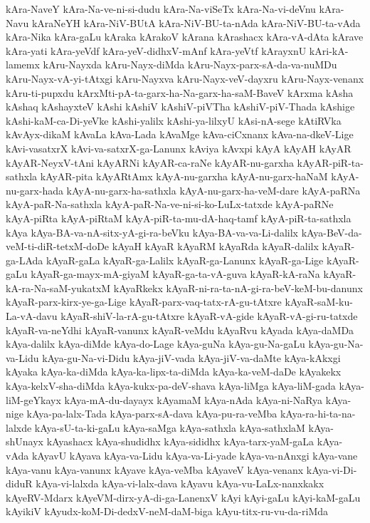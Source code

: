 {kAra-NaveY
kAra-Na-ve-ni-si-dudu
kAra-Na-viSeTx
kAra-Na-vi-deVnu
kAra-Navu
kAraNeYH
kAra-NiV-BUtA
kAra-NiV-BU-ta-nAda
kAra-NiV-BU-ta-vAda
kAra-Nika
kAra-gaLu
kAraka
kArakoV
kArana
kArashacx
kAra-vA-dAta
kArave
kAra-yati
kAra-yeVdf
kAra-yeV-didhxV-mAnf
kAra-yeVtf
kArayxnU
kAri-kA-lamemx
kAru-Nayxda
kAru-Nayx-diMda
kAru-Nayx-parx-sA-da-va-nuMDu
kAru-Nayx-vA-yi-tAtxgi
kAru-Nayxva
kAru-Nayx-veV-dayxru
kAru-Nayx-venanx
kAru-ti-pupxdu
kArxMti-pA-ta-garx-ha-Na-garx-ha-saM-BaveV
kArxma
kAsha
kAshaq
kAshayxteV
kAshi
kAshiV
kAshiV-piVTha
kAshiV-piV-Thada
kAshige
kAshi-kaM-ca-Di-yeVke
kAshi-yalilx
kAshi-ya-lilxyU
kAsi-nA-sege
kAtiRVka
kAvAyx-dikaM
kAvaLa
kAva-Lada
kAvaMge
kAva-ciCxnanx
kAva-na-dkeV-Lige
kAvi-vasatxrX
kAvi-va-satxrX-ga-Lanunx
kAviya
kAvxpi
kAyA
kAyAH
kAyAR
kAyAR-NeyxV-tAni
kAyARNi
kAyAR-ca-raNe
kAyAR-nu-garxha
kAyAR-piR-ta-sathxla
kAyAR-pita
kAyARtAmx
kAyA-nu-garxha
kAyA-nu-garx-haNaM
kAyA-nu-garx-hada
kAyA-nu-garx-ha-sathxla
kAyA-nu-garx-ha-veM-dare
kAyA-paRNa
kAyA-paR-Na-sathxla
kAyA-paR-Na-ve-ni-si-ko-LuLx-tatxde
kAyA-paRNe
kAyA-piRta
kAyA-piRtaM
kAyA-piR-ta-mu-dA-haq-tamf
kAyA-piR-ta-sathxla
kAya
kAya-BA-va-nA-sitx-yA-gi-ra-beVku
kAya-BA-va-va-Li-dalilx
kAya-BeV-da-veM-ti-diR-tetxM-doDe
kAyaH
kAyaR
kAyaRM
kAyaRda
kAyaR-dalilx
kAyaR-ga-LAda
kAyaR-gaLa
kAyaR-ga-Lalilx
kAyaR-ga-Lanunx
kAyaR-ga-Lige
kAyaR-gaLu
kAyaR-ga-mayx-mA-giyaM
kAyaR-ga-ta-vA-guva
kAyaR-kA-raNa
kAyaR-kA-ra-Na-saM-yukatxM
kAyaRkekx
kAyaR-ni-ra-ta-nA-gi-ra-beV-keM-bu-danunx
kAyaR-parx-kirx-ye-ga-Lige
kAyaR-parx-vaq-tatx-rA-gu-tAtxre
kAyaR-saM-ku-La-vA-davu
kAyaR-shiV-la-rA-gu-tAtxre
kAyaR-vA-gide
kAyaR-vA-gi-ru-tatxde
kAyaR-va-neYdhi
kAyaR-vanunx
kAyaR-veMdu
kAyaRvu
kAyada
kAya-daMDa
kAya-dalilx
kAya-diMde
kAya-do-Lage
kAya-guNa
kAya-gu-Na-gaLu
kAya-gu-Na-va-Lidu
kAya-gu-Na-vi-Didu
kAya-jiV-vada
kAya-jiV-va-daMte
kAya-kAkxgi
kAyaka
kAya-ka-diMda
kAya-ka-lipx-ta-diMda
kAya-ka-veM-daDe
kAyakekx
kAya-kelxV-sha-diMda
kAya-kukx-pa-deV-shava
kAya-liMga
kAya-liM-gada
kAya-liM-geYkayx
kAya-mA-du-dayayx
kAyamaM
kAya-nAda
kAya-ni-NaRya
kAya-nige
kAya-pa-lalx-Tada
kAya-parx-sA-dava
kAya-pu-ra-veMba
kAya-ra-hi-ta-na-lalxde
kAya-sU-ta-ki-gaLu
kAya-saMga
kAya-sathxla
kAya-sathxlaM
kAya-shUnayx
kAyashacx
kAya-shudidhx
kAya-sididhx
kAya-tarx-yaM-gaLa
kAya-vAda
kAyavU
kAyava
kAya-va-Lidu
kAya-va-Li-yade
kAya-va-nAnxgi
kAya-vane
kAya-vanu
kAya-vanunx
kAyave
kAya-veMba
kAyaveV
kAya-venanx
kAya-vi-Di-diduR
kAya-vi-lalxda
kAya-vi-lalx-dava
kAyavu
kAya-vu-LaLx-nanxkakx
kAyeRV-Mdarx
kAyeVM-dirx-yA-di-ga-LanenxV
kAyi
kAyi-gaLu
kAyi-kaM-gaLu
kAyikiV
kAyudx-koM-Di-dedxV-neM-daM-biga
kAyu-titx-ru-vu-da-riMda
}

